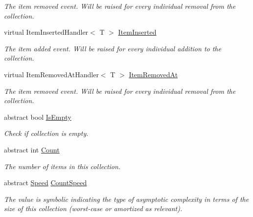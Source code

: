 \begin{DoxyCompactItemize}
\begin{DoxyCompactList}\small\item\em The item removed event. Will be raised for every individual removal from the collection. \end{DoxyCompactList}\item 
virtual Item\+Inserted\+Handler$<$ T $>$ \hyperlink{class_c5_1_1_collection_value_base_acfa66e3ccad2023f13ce71b2114e7809}{Item\+Inserted}
\begin{DoxyCompactList}\small\item\em The item added event. Will be raised for every individual addition to the collection. \end{DoxyCompactList}\item 
virtual Item\+Removed\+At\+Handler$<$ T $>$ \hyperlink{class_c5_1_1_collection_value_base_a9cd4d9d9e588e1a8fe51390906b3c66a}{Item\+Removed\+At}
\begin{DoxyCompactList}\small\item\em The item removed event. Will be raised for every individual removal from the collection. \end{DoxyCompactList}\item 
abstract bool \hyperlink{class_c5_1_1_collection_value_base_a9b906017c85e357268f116b3ac05e665}{Is\+Empty}
\begin{DoxyCompactList}\small\item\em Check if collection is empty. \end{DoxyCompactList}\item 
abstract int \hyperlink{class_c5_1_1_collection_value_base_ac27de36f8fcd6bd3c66ce04768adfe1e}{Count}
\begin{DoxyCompactList}\small\item\em The number of items in this collection. \end{DoxyCompactList}\item 
abstract \hyperlink{namespace_c5_a615ba88dcdaa8d5a3c5f833a73d7fad6}{Speed} \hyperlink{class_c5_1_1_collection_value_base_a29cca9929ed4b155a56f6c7297208ef3}{Count\+Speed}
\begin{DoxyCompactList}\small\item\em The value is symbolic indicating the type of asymptotic complexity in terms of the size of this collection (worst-\/case or amortized as relevant). \end{DoxyCompactList}\end{DoxyCompactItemize}
